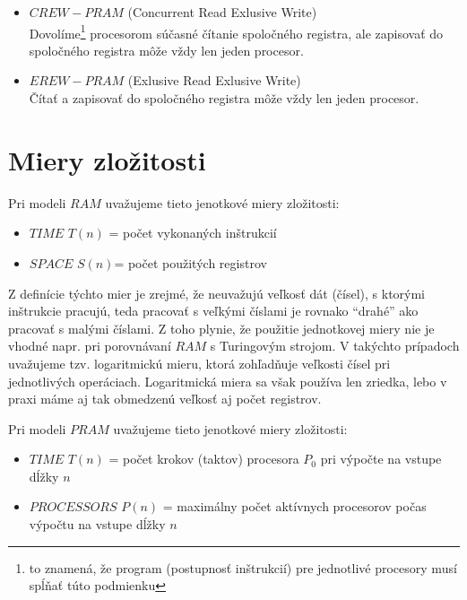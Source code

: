 \begin{enumerate}
\begin{itemize}
\begin{itemize}
{      že pri opakovanom výpočte na rovnakom vstupe dostaneme
      rozdielne výstupy} z procesorov žiadajúcich o zápis zapíše
      svoju hodnotu do registra
    \end{itemize}
    \item $CREW-PRAM$ (Concurrent Read Exlusive Write) \\ Dovolíme\footnote{to
    znamená, že program (postupnosť inštrukcií) pre jednotlivé
    procesory musí spĺňať túto podmienku}
    procesorom súčasné čítanie spoločného registra, ale zapisovať do
    spoločného registra môže vždy len jeden procesor.
    \item $EREW-PRAM$ (Exlusive Read Exlusive Write) \\ Čítať a zapisovať do
    spoločného registra môže vždy len jeden procesor.
  \end{itemize}
\end{enumerate}

\section{Miery zložitosti}

Pri modeli $RAM$ uvažujeme tieto jenotkové miery zložitosti:
\begin{itemize}
  \item $TIME$ $T(n)$ = počet vykonaných inštrukcií
  \item $SPACE$ $S(n)$= počet použitých registrov
\end{itemize}
Z definície týchto mier je zrejmé, že neuvažujú veľkosť dát
(čísel), s ktorými inštrukcie pracujú, teda pracovať s veľkými
číslami je rovnako ``drahé'' ako pracovať s malými číslami. Z toho
plynie, že použitie jednotkovej miery nie je vhodné napr. pri
porovnávaní $RAM$ s Turingovým strojom. V takýchto prípadoch
uvažujeme tzv. logaritmickú mieru, ktorá zohľadňuje veľkosti čísel
pri jednotlivých operáciach. Logaritmická miera sa však používa
len zriedka, lebo v praxi máme aj tak obmedzenú veľkosť aj počet
registrov.

\pagebreak

Pri modeli $PRAM$ uvažujeme tieto jenotkové miery zložitosti:
\begin{itemize}
  \item $TIME$ $T(n)$ = počet krokov (taktov) procesora $P_0$ pri
  výpočte na vstupe dĺžky $n$
  \item $PROCESSORS$ $P(n)$ = maximálny počet aktívnych procesorov
  počas výpočtu na vstupe dĺžky $n$
\end{itemize}

